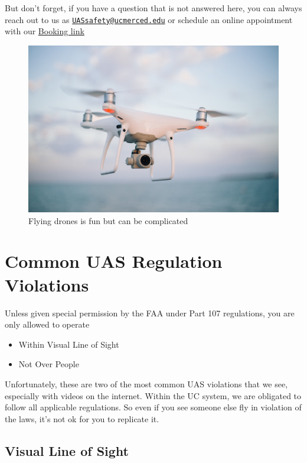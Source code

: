 \documentclass[
  12pt,
]{book}
\providecommand{\tightlist}{%
  \setlength{\itemsep}{0pt}\setlength{\parskip}{0pt}}
\begin{document}
But don't forget, if you have a question that is not answered here, you can always reach out to us as \href{mailto:UASsafety@ucmerced.edu}{\nolinkurl{UASsafety@ucmerced.edu}} or schedule an online appointment with our \href{https://outlook.office365.com/owa/calendar/UCCenterofExcellenceonUASSafety@merced.onmicrosoft.com/bookings/}{Booking link}

\begin{figure}

{\centering \includegraphics[width=0.75\linewidth]{images/phantom_1} 

}

\caption{Flying drones is fun but can be complicated}\label{fig:drone2}
\end{figure}

\section{Common UAS Regulation Violations}\label{common-UAS-violations}

Unless given special permission by the FAA under Part 107 regulations, you are only allowed to operate

\begin{itemize}
\tightlist
\item
  Within Visual Line of Sight
\item
  Not Over People
\end{itemize}

Unfortunately, these are two of the most common UAS violations that we see, especially with videos on the internet. Within the UC system, we are obligated to follow all applicable regulations. So even if you see someone else fly in violation of the laws, it's not ok for you to replicate it.

\subsection{Visual Line of Sight}\label{visual-line-of-sight}
\end{document}
